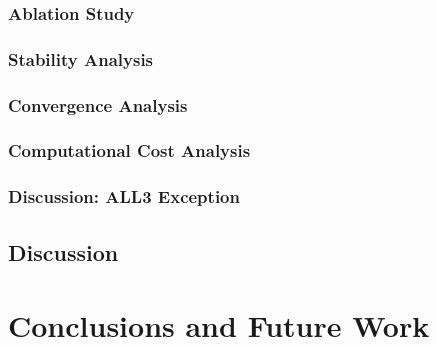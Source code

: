 \subsubsection{Ablation Study}

\subsubsection{Stability Analysis}

\subsubsection{Convergence Analysis}

\subsubsection{Computational Cost Analysis}

\subsubsection{Discussion: ALL3 Exception}

\subsection{Discussion}


\section{Conclusions and Future Work}
%


